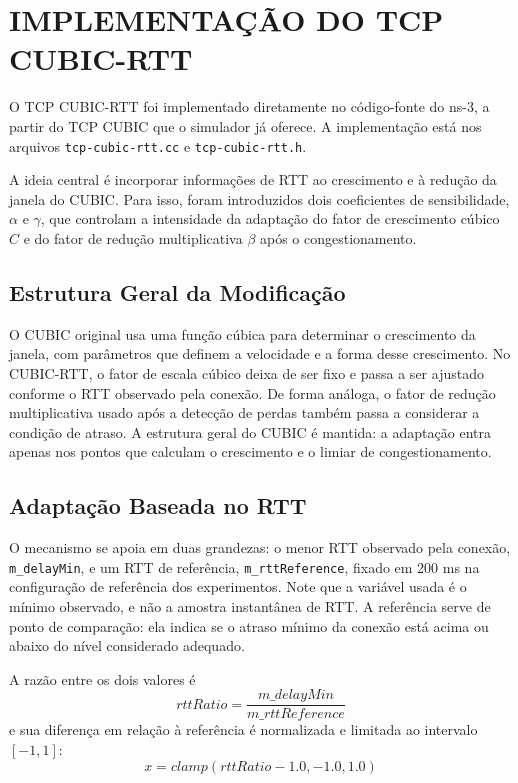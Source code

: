 \chapter{IMPLEMENTAÇÃO DO TCP CUBIC-RTT}

O TCP CUBIC-RTT foi implementado diretamente no código-fonte do ns-3, a partir do TCP CUBIC que o simulador já oferece. A implementação está nos arquivos \texttt{tcp-cubic-rtt.cc} e \texttt{tcp-cubic-rtt.h}.

A ideia central é incorporar informações de RTT ao crescimento e à redução da janela do CUBIC. Para isso, foram introduzidos dois coeficientes de sensibilidade, $\alpha$ e $\gamma$, que controlam a intensidade da adaptação do fator de crescimento cúbico $C$ e do fator de redução multiplicativa $\beta$ após o congestionamento.

\section{Estrutura Geral da Modificação}

O CUBIC original usa uma função cúbica para determinar o crescimento da janela, com parâmetros que definem a velocidade e a forma desse crescimento. No CUBIC-RTT, o fator de escala cúbico deixa de ser fixo e passa a ser ajustado conforme o RTT observado pela conexão. De forma análoga, o fator de redução multiplicativa usado após a detecção de perdas também passa a considerar a condição de atraso. A estrutura geral do CUBIC é mantida: a adaptação entra apenas nos pontos que calculam o crescimento e o limiar de congestionamento.

\section{Adaptação Baseada no RTT}

O mecanismo se apoia em duas grandezas: o menor RTT observado pela conexão, \texttt{m\_delayMin}, e um RTT de referência, \texttt{m\_rttReference}, fixado em 200 ms na configuração de referência dos experimentos. Note que a variável usada é o mínimo observado, e não a amostra instantânea de RTT. A referência serve de ponto de comparação: ela indica se o atraso mínimo da conexão está acima ou abaixo do nível considerado adequado.

A razão entre os dois valores é
\begin{equation}
rttRatio = \frac{m\_delayMin}{m\_rttReference}
\end{equation}
e sua diferença em relação à referência é normalizada e limitada ao intervalo $[-1, 1]$:
\begin{equation}
x = clamp(rttRatio - 1.0, -1.0, 1.0)
\end{equation}


